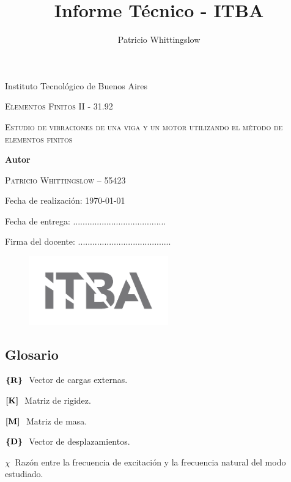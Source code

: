 \documentclass[onecolumn,10pt,titlepage,a4paper]{article}
\title{Informe Técnico - ITBA}
\author{Patricio Whittingslow}
\newcommand{\glossentry}[2]{$#1\ $ \indent #2 \par \vspace{.4cm} }
\begin{document}
\begin{titlepage}
	\centering
	
	{ \large Instituto Tecnológico de Buenos Aires  \par }
	\vspace{2cm}
	{\Large \scshape Elementos Finitos II - 31.92 \par}
	\vspace{2cm}
	{\Huge \scshape Estudio de vibraciones de una viga y un motor utilizando el método de elementos finitos\par }
	\vspace{.5cm}
	{\Large  \par}
	\vspace{2cm}
	{\large \bf Autor \par}
	\vspace{.5cm}
	\textsc{\large Patricio Whittingslow -- 55423}
	\vspace{2cm}
	{\par \large Fecha de realización: \today \par}
	\vspace{1cm}
	{\large Fecha de entrega: .......................................\par}
	\vspace{\fill}
	{\large Firma del docente: .......................................}
	\vspace{\fill}
	\begin{figure}[htb!]
		\centering
		\includegraphics[width=6cm]{fig/logoitba.png}
	\end{figure}
\end{titlepage}




\begin{multicols}{2}
	\section*{Glosario}
	\glossentry{\Cme{R}}{Vector de cargas externas.}
	\glossentry{\Mme{K}}{Matriz de rigidez.}
	\glossentry{\Mme{M}}{Matriz de masa.}
	\glossentry{\Cme{D}}{Vector de desplazamientos.}
	\glossentry{\chi}{Razón entre la frecuencia de excitación y la frecuencia natural del modo estudiado.}
\end{multicols}
\end{document}
